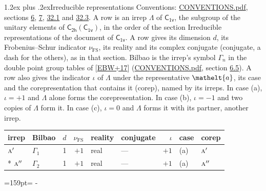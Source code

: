 \documentclass[10pt,a4paper]{article}
\makeatletter
\renewcommand\section{\@startsection{section}{1}{\z@}{-3ex plus -1ex minus -.2ex}%
  {1.2ex plus .2ex}{\normalfont\large\sffamily\bfseries\color{parttitle}}}
\newcommand{\needspace}[1]{\par\penalty-100\begingroup\dimen0=#1\relax\dimen2=\pagegoal
  \advance\dimen2-\pagetotal\ifdim\dimen0>\dimen2\relax\ifdim\dimen2>0pt\vfil\break\fi\fi
  \endgroup}
\numberwithin{equation}{section}
\newcommand{\eltfont}[1]{{\let\sigma\eltsigma\mathelt{#1}}}
\newcommand{\grp}[1]{\mathsf{#1}}
\newcommand{\irr}[1]{\text{\normalfont\scshape #1}}
\newcommand{\elt}[1]{\eltfont{#1}}
\newcommand{\fsind}{\nu_{\mathrm{FS}}}
\makeatother
\begin{document}
\section{Irreducible representations}\label{s:irreps}
Conventions: \href{../../CONVENTIONS.pdf}{CONVENTIONS.pdf}, sections \href{../../../rotation/CONVENTIONS.pdf\#conv.6}{6}, \href{../../../rotation/CONVENTIONS.pdf\#conv.7}{7}, \href{../../CONVENTIONS.pdf\#conv.32.1}{32.1} and \href{../../CONVENTIONS.pdf\#conv.32.3}{32.3}.
\leavevmode\label{n:irrep.Delta}A row is an irrep $\Lambda$ of $\grp{C_{1v}}$, the subgroup of the unitary elements of $\grp{C_{2h}}(\grp{C_{1v}})$, in the order of the section Irreducible representations of the document of \href{../../../rotation/data/pdf/C1v.pdf}{$\grp{C_{1v}}$}. \label{n:index.dimension}\label{n:index.frobenius}\label{n:head.irrep}\label{n:head.reality}\label{n:head.conjugate}A row gives its dimension $d$, its Frobenius--Schur indicator $\fsind$, its reality and its complex conjugate (conjugate, a dash for the others), as in that section. \label{n:head.bilbao}\label{n:irrep.alias.gamma}Bilbao is the irrep's symbol $\Gamma_n$ in the double point group tables of [\href{../../../REFERENCES.pdf\#ref.EBW+17}{EBW+17}] (\href{../../CONVENTIONS.pdf}{CONVENTIONS.pdf}, section \href{../../../rotation/CONVENTIONS.pdf\#conv.6.5}{6.5}). \label{n:head.case.corep}\label{n:head.corep}A row also gives the indicator $\iota$ of $\Lambda$ under the representative $\elt{a}$, its case and the corepresentation that contains it (corep), named by its irreps. In case (a), $\iota = +1$ and $\Lambda$ alone forms the corepresentation. In case (b), $\iota = -1$ and two copies of $\Lambda$ form it. In case (c), $\iota = 0$ and $\Lambda$ forms it with its partner, another irrep.
\setlength{\emergencystretch}{2em}\par\setlength{\emergencystretch}{0pt}
{\small\renewcommand{\arraystretch}{1.25}\setlength{\tabcolsep}{4pt}\begin{longtable}{@{}llrrllrll@{}}\toprule
irrep & Bilbao & $d$ & $\fsind$ & reality & conjugate & $\iota$ & case & corep\\\midrule\endhead
\bottomrule\endfoot\endlastfoot
$\irr{a}'$ & $\Gamma_{1}$ & 1 & $+1$ & real & --- & $+1$ & (a) & $\irr{a}'$\\*
$\irr{a}''$ & $\Gamma_{2}$ & 1 & $+1$ & real & --- & $+1$ & (a) & $\irr{a}''$\\
\bottomrule\end{longtable}}
\needspace{159pt}
\end{document}

